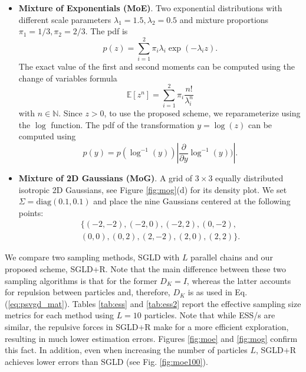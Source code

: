 \begin{itemize}
\setlength\itemsep{-0.2em}
\item \textbf{Mixture of Exponentials (MoE)}. Two exponential distributions with different scale parameters $\lambda_1 = 1.5, \lambda_2=0.5$ and mixture proportions $\pi_1 = 1/3, \pi_2 = 2/3$. The pdf is
$$ 
p(z) = \sum_{i=1}^2 \pi_{i}\lambda_i \exp(-\lambda_i z).
$$
The exact value of the first and second moments can be computed using the change of variables formula
\begin{equation*}
\mathbb{E} \left[z^n \right] = \sum_{i=1}^2 \pi_{i}\frac{n!}{\lambda_i^n}
\end{equation*}
with $n\in \mathbb{N}$. 
Since $z>0$, to use the proposed scheme, we reparameterize using the $\log$ function. The pdf of the transformation $y = \log(z)$ can be computed using
\begin{equation*}
p(y) = p(\log^{-1}(y))|\dfrac{\partial}{\partial y} \log^{-1}(y))|.
\end{equation*}
\item \textbf{Mixture of 2D Gaussians (MoG)}. A grid of $3 \times 3$ equally distributed isotropic 2D Gaussians, see Figure \ref{fig:mog}(d) for its density plot.  We set $\Sigma = \mbox{diag} (0.1, 0.1)$ and place the nine Gaussians centered at the following points:
\begin{align*}
\lbrace (-2,-2), (-2, 0), (-2, 2), (0, -2), \\(0, 0), (0, 2), (2, -2), (2, 0), (2, 2)  \rbrace.
\end{align*}
\end{itemize}
We compare two sampling methods, SGLD with $L$ parallel chains and our proposed scheme, SGLD+R. Note that the main difference between these two sampling algorithms is that for the former ${D_K} = {I}$, whereas the latter accounts for repulsion between particles and, therefore, $D_K$ is as used in Eq. (\ref{eq:psvgd_mat}). Tables \ref{tab:ess} and \ref{tab:ess2} report the effective sampling size metrics \cite{kass1998markov} for each method using $L=10$ particles. Note that while ESS/s are similar, the repulsive forces in SGLD+R make for a more efficient exploration, resulting in much lower estimation errors. Figures \ref{fig:moe} and \ref{fig:mog} confirm this fact. In addition, even when increasing the number of particles $L$, SGLD+R achieves lower errors than SGLD (see Fig. \ref{fig:moe100}).



